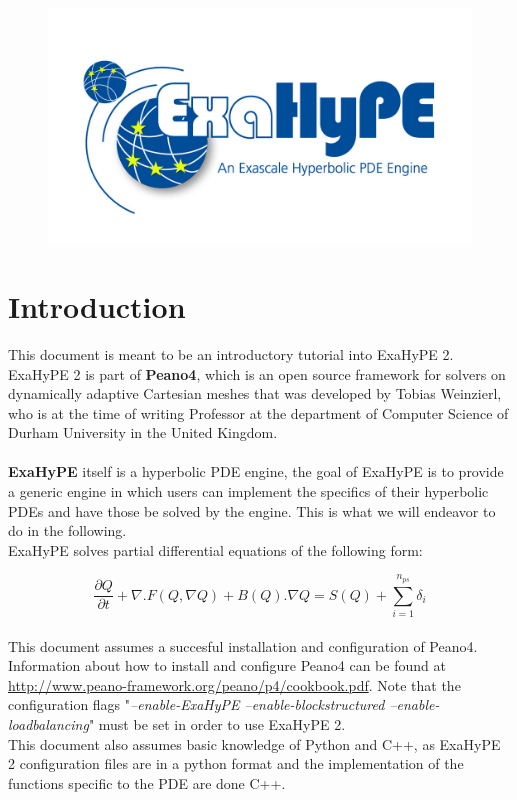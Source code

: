 \documentclass[12pt,letterpaper]{article}
\begin{document}
\begin{figure}[!h]
\centering
\includegraphics[width=0.5\linewidth]{pictures/ExaHyPE_Logo.jpg}
\end{figure}

\section{Introduction}
\label{sec:Introduction}

\vspace{0.2cm}

This document is meant to be an introductory tutorial into ExaHyPE 2. ExaHyPE 2 is part of \textbf{Peano4}, which is an open source framework for solvers on dynamically adaptive Cartesian meshes that was developed by Tobias Weinzierl, who is at the time of writing Professor at the department of Computer Science of Durham University in the United Kingdom.\\ \\
\textbf{ExaHyPE} itself is a hyperbolic PDE engine, the goal of ExaHyPE is to provide a generic engine in which users can implement the specifics of their hyperbolic PDEs and have those be solved by the engine. This is what we will endeavor to do in the following. \\
ExaHyPE solves partial differential equations of the following form:


\begin{equation*}
    \frac{\partial Q}{\partial t} + \nabla . F(Q, \nabla Q) + B(Q) . \nabla Q= S(Q) + \sum_{i = 1}^{n_{ps}} \delta_i
\end{equation*}
\\

This document assumes a succesful installation and configuration of Peano4. \\
Information about how to install and configure Peano4 can be found at \hyperlink{http://www.peano-framework.org/peano/p4/cookbook.pdf}{http://www.peano-framework.org/peano/p4/cookbook.pdf}. Note that the configuration flags "\textit{--enable-ExaHyPE --enable-blockstructured --enable-loadbalancing}" must be set in order to use ExaHyPE 2. \\ 
This document also assumes basic knowledge of Python and C++, as ExaHyPE 2 configuration files are in a python format and the implementation of the functions specific to the PDE are done C++.  \\
\end{document}
